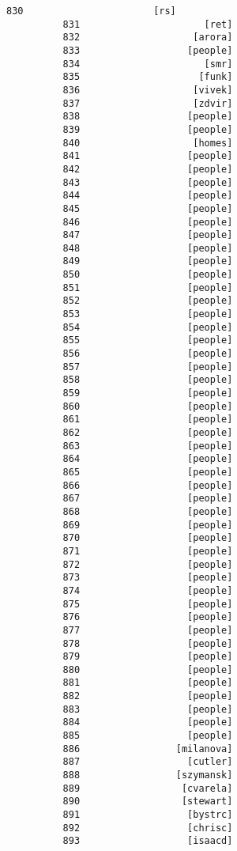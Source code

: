 \documentclass[11pt]{article}
\begin{document}
\begin{Verbatim}[commandchars=\\\{\}]
          830                       [rs]
          831                      [ret]
          832                    [arora]
          833                   [people]
          834                      [smr]
          835                     [funk]
          836                    [vivek]
          837                    [zdvir]
          838                   [people]
          839                   [people]
          840                    [homes]
          841                   [people]
          842                   [people]
          843                   [people]
          844                   [people]
          845                   [people]
          846                   [people]
          847                   [people]
          848                   [people]
          849                   [people]
          850                   [people]
          851                   [people]
          852                   [people]
          853                   [people]
          854                   [people]
          855                   [people]
          856                   [people]
          857                   [people]
          858                   [people]
          859                   [people]
          860                   [people]
          861                   [people]
          862                   [people]
          863                   [people]
          864                   [people]
          865                   [people]
          866                   [people]
          867                   [people]
          868                   [people]
          869                   [people]
          870                   [people]
          871                   [people]
          872                   [people]
          873                   [people]
          874                   [people]
          875                   [people]
          876                   [people]
          877                   [people]
          878                   [people]
          879                   [people]
          880                   [people]
          881                   [people]
          882                   [people]
          883                   [people]
          884                   [people]
          885                   [people]
          886                 [milanova]
          887                   [cutler]
          888                 [szymansk]
          889                  [cvarela]
          890                  [stewart]
          891                   [bystrc]
          892                   [chrisc]
          893                   [isaacd]

\end{Verbatim}
\end{document}
